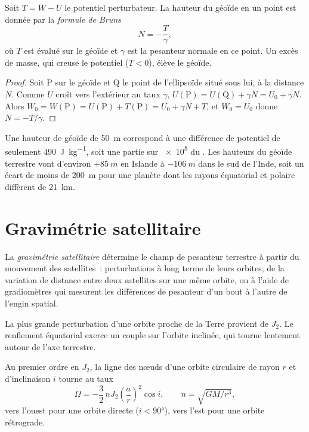 \begin{proposition}\label{prop:b3:gravity-geodesy:bruns}
Soit $T = W - U$ le potentiel perturbateur. La hauteur du géoïde en un point est
donnée par la \emph{formule de Bruns}
\[
  N = -\frac{T}{\gamma},
\]
où $T$ est évalué sur le géoïde et $\gamma$ est la pesanteur normale en ce point. Un
excès de masse, qui creuse le potentiel ($T < 0$), élève le géoïde.
\end{proposition}

\begin{proof}
Soit P sur le géoïde et Q le point de l'ellipsoïde situé sous lui, à la distance
$N$. Comme $U$ croît vers l'extérieur au taux $\gamma$,
$U(\mathrm P) = U(\mathrm Q) + \gamma N = U_0 + \gamma N$. Alors
$W_0 = W(\mathrm P) = U(\mathrm P) + T(\mathrm P) = U_0 + \gamma N + T$, et
$W_0 = U_0$ donne $N = -T/\gamma$.
\end{proof}

Une hauteur de géoïde de \qty{50}{m} correspond à une différence de potentiel de seulement
\qty{490}{J.kg^{-1}}, soit une partie sur \num{e5} du . Les
hauteurs du géoïde terrestre vont d'environ $+\qty{85}{m}$ en Islande à
$-\qty{106}{m}$ dans le sud de l'Inde,
soit un écart de moins de \qty{200}{m} pour une planète dont les rayons équatorial et polaire
diffèrent de \qty{21}{km}.

\section{Gravimétrie satellitaire}

\begin{definition}\label{def:b3:gravity-geodesy:satgrav}
La \emph{gravimétrie satellitaire} détermine le champ
de pesanteur terrestre à partir du mouvement des satellites~: perturbations à long terme
de leurs orbites, de la variation de distance entre deux satellites sur une même
orbite, ou à l'aide de gradiomètres qui mesurent les différences de pesanteur d'un bout
à l'autre de l'engin spatial.
\end{definition}

La plus grande perturbation d'une orbite proche de la Terre provient de $J_2$. Le
renflement équatorial exerce un couple sur l'orbite inclinée, qui tourne lentement
autour de l'axe terrestre.

\begin{proposition}\label{prop:b3:gravity-geodesy:nodal}
Au premier ordre en $J_2$, la ligne des nœuds d'une orbite circulaire de rayon $r$ et
d'inclinaison $i$ tourne au taux
\[
  \dot\Omega = -\frac32\,nJ_2\left(\frac ar\right)^2\cos i,\qquad n = \sqrt{GM/r^3} ,
\]
vers l'ouest pour une orbite directe ($i < \ang{90}$), vers l'est pour une orbite rétrograde.
\end{proposition}

